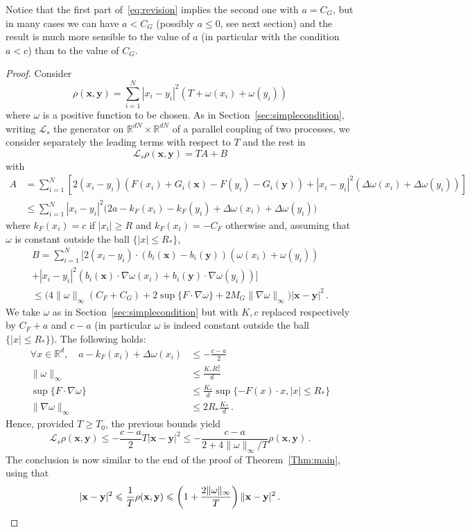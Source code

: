 \documentclass[AHL,Unicode,longabstracts,published]{cedram}
\newcommand{\R}{\mathbb R}
\newcommand{\clL}{\mathcal L}
\newcommand{\na}{\nabla}
\newcommand{\1}{\mathbbm{1}}
\newcommand{\bx}{\mathbf{x}}
\newcommand{\by}{\mathbf{y}}
\newcommand{\nv}[1]{#1}
\let\oldforall\forall
\renewcommand*{\forall}{\mathrel{\oldforall}}
\newcommand{\R}{\mathbb R}
\begin{document}
Notice that the first part of~\eqref{eq:revision} implies the second one with $a = C_G$, but in many cases we can have $a<C_G$ (possibly $a\leqslant 0$, see next section) and the result is much more sensible to the value of $a$ (in particular with the condition $a<c$) than to the value of $C_G$.

\begin{proof}
Consider
\[
\rho(\bx,\by) = \sum_{i=1}^N |x_i-y_i|^{2} \left( T + \nv{\omega}(x_i)+ \nv{\omega}(y_i)\right)
\]
where $\nv{\omega}$ is a positive function to be chosen. As in Section~\ref{sec:simplecondition}, writing $\clL_s$ the generator on $\R^{dN}\times\R^{dN}$ of a parallel coupling of two processes, we consider separately the leading terms with respect to $T$ and the rest in
\[
\clL_s \rho(\bx,\by) = TA+B
\]
with
\begin{align*}
A &= \sum_{i=1}^N \left[ 2(x_i-y_i) \left( F(x_i)+G_i(\bx)-F(y_i)-G_i(\by)\right) + |x_i-y_i|^2 \left( \Delta \nv{\omega}(x_i)+\Delta\nv{\omega}(y_i)\right)\right] \\
& \leqslant \sum_{i=1}^N |x_i-y_i|^2 \big( 2a-k_F(x_i)-k_F(y_i) + \Delta \nv{\omega}(x_i)+\Delta\nv{\omega}(y_i)\big)
\end{align*}
where $k_F(x_i)=c$ if $|x_i|\geqslant R$ and $k_F(x_i)=-C_F$ otherwise and, assuming that $\omega$ is constant outside the ball $\{|x|\leqslant R_*\}$,
\begin{multline*}
B = \sum_{i=1}^N \big[2 (x_i-y_i)\cdot \left( b_i(\bx)-b_i(\by)\right) \left( \nv{\omega}(x_i)+\nv{\omega}(y_i)\right)\\
 + |x_i-y_i|^2\left( b_i(\bx)\cdot \na \nv{\omega}(x_i)+b_i(\by)\cdot \na \nv{\omega}(y_i)\right)\big]\\
\leqslant \big( 4\|\nv{\omega}\|_\infty \left( C_F+C_G\right) + 2\sup\{F\cdot\na \nv{\omega}\} + 2M_G\|\na\nv{\omega}\|_\infty\big) |\bx-\by|^2 \,.
\end{multline*}
We take $\nv{\omega}$ as in Section~\ref{sec:simplecondition} but with $K,c$ replaced respectively by $C_F+a$ and $c-a$ \nv{(in particular $\omega$ is indeed constant outside the ball $\{|x|\leqslant R_*\}$)}. The following holds:
\begin{align*}
\forall x\in\R^d,\quad a - k_F(x_i) + \Delta \nv{\omega}(x_i) & \leqslant - \frac{c-a}{2}\\
\|\nv{\omega}\|_\infty &\leqslant \frac{K_* R_*^2}{d} \\
\sup\{F\cdot\na \nv{\omega}\} &\leqslant \frac{K_*}{d} \sup\{-F(x)\cdot x, |x|\leqslant R_*\}\\
\|\na \nv{\omega}\|_\infty &\leqslant 2R_* \frac{K_*}{d}\,.
\end{align*}
Hence, provided $T\geqslant T_0$, the previous bounds yield
\[
\clL_s \rho(\bx,\by) \leqslant -\frac{c-a}2 T|\bx-\by|^2 \leqslant -\frac{c-a}{2+4\|\nv{\omega}\|_\infty/T} \rho(\bx,\by)\,.
\]
The conclusion is now similar to the end of the proof of Theorem~\ref{Thm:main}, using that
\[
|\bx-\by|^2 \leqslant \frac1T \rho(\bx,\by) \leqslant \left( 1+\frac{2\|\nv{\omega}\|_\infty}T\right)\|\bx-\by|^2\,.\qedhere
\]
\end{proof}
\end{document}
